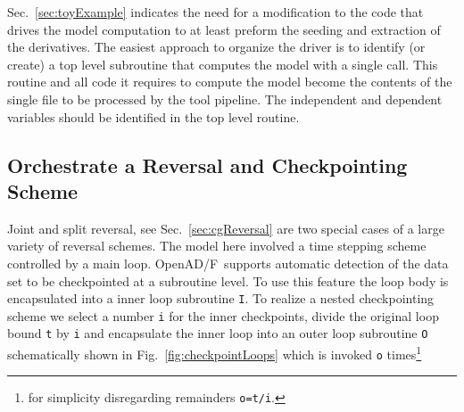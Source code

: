 \documentclass{book}
\newcommand{\OpenADF}{OpenAD/F}
\newcommand{\code}[1]{{\small\tt{#1}}}
\newcommand{\refsec}[1]{{Sec.~\ref{#1}}}
\newcommand{\reffig}[1]{{Fig.~\ref{#1}}}
\begin{document}
\refsec{sec:toyExample} indicates the need for a modification 
to the code that drives the model computation to at least 
preform the seeding and extraction of the derivatives. 
The easiest approach to organize the driver is to identify (or create) 
a top level subroutine that computes the model with a single call. 
This routine and all code it requires to compute the model 
become the contents of the single file to be processed by the tool pipeline.
The independent and dependent variables should be identified in the top level routine.  

\subsection{Orchestrate a Reversal and Checkpointing Scheme}
Joint and split reversal, see \refsec{sec:cgReversal} are two special cases 
of a large variety of reversal schemes. The model here involved a time stepping 
scheme controlled by a main loop. \OpenADF\ supports automatic detection of the 
data set to be checkpointed at a subroutine level. To use this feature the loop 
body is encapsulated into a inner loop subroutine \code{I}. To realize a nested checkpointing scheme
we select a number \code{i} for the inner checkpoints, 
divide the original loop bound \code{t} by \code{i} and encapsulate the inner loop 
into an outer loop subroutine \code{O} schematically shown in \reffig{fig:checkpointLoops} 
which is invoked \code{o} times\footnote{
for simplicity disregarding remainders {\tt o=t/i}.
}
\end{document}
